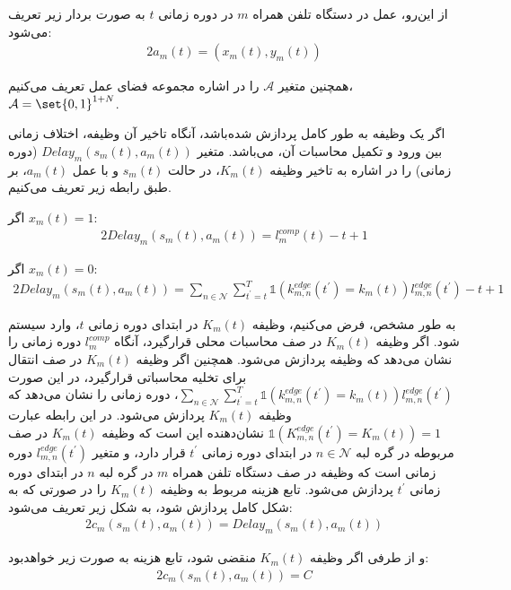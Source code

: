 

از این‌رو، عمل در دستگاه تلفن همراه $m$ در دوره زمانی $t$ به صورت بردار زیر تعریف می‌شود:
\begin{alignat}{2}
	a_m(t) = (x_m(t), y_m(t))
	\label{14}  
\end{alignat}


همچنین متغیر $\mathcal{A}$ را در اشاره مجموعه فضای عمل تعریف می‌کنیم، $\mathcal{A} = \set{0,1}^{1+N}$. 


اگر یک وظیفه به طور کامل پردازش شده‌باشد، آنگاه تاخیر آن وظیفه، اختلاف زمانی بین ورود و تکمیل محاسبات آن، می‌باشد. متغیر $Delay_m(s_m(t),a_m(t))$ (دوره زمانی) را در اشاره به تاخیر وظیفه $K_m(t)$، در حالت $s_m(t)$ و با عمل $a_m(t)$، بر طبق رابطه زیر تعریف می‌کنیم. 

اگر $x_m(t) = 1$:
\begin{alignat}{2}
	Delay_m(s_m(t),a_m(t)) = l_m^{comp}(t) - t + 1
	\label{15}  
\end{alignat}

اگر $x_m(t) = 0$:
\begin{alignat}{2}
	Delay_m(s_m(t),a_m(t)) = \sum\limits_{n \in \mathcal{N}} \sum\limits_{t^{'}=t}^{T}\mathds{1}(k_{m,n}^{edge}(t^{'}) = k_m(t))l_{m,n}^{edge}(t^{'}) - t +1
	\label{16}  
\end{alignat}


به طور مشخص، فرض می‌کنیم، وظیفه $K_m(t)$ در ابتدای دوره زمانی $t$، وارد سیستم شود. اگر وظیفه $K_m(t)$ در صف محاسبات محلی قرارگیرد، آنگاه $l_m^{comp}$ دوره زمانی را نشان می‌دهد که وظیفه پردازش می‌شود. همچنین اگر وظیفه $K_m(t)$ در صف انتقال برای تخلیه محاسباتی قرارگیرد، در این صورت $\sum\limits_{n \in \mathcal{N}} \sum\limits_{t^{'}=t}^{T}\mathds{1}(k_{m,n}^{edge}(t^{'}) = k_m(t))l_{m,n}^{edge}(t^{'})$، دوره زمانی را نشان می‌دهد که وظیفه $K_m(t)$ پردازش می‌شود. در این رابطه عبارت $\mathds{1}(K_{m,n}^{edge}(t^{'}) = K_m(t)) = 1$ نشان‌دهنده این است که وظیفه $K_m(t)$ در صف مربوطه در گره لبه $n \in \mathcal{N}$ در ابتدای دوره زمانی $t^{'}$ قرار دارد، و متغیر $l_{m,n}^{edge}(t^{'})$ دوره زمانی است که وظیفه در صف دستگاه تلفن همراه $m$ در گره لبه $n$ در ابتدای دوره زمانی $t^{'}$ پردازش می‌شود. 
تابع هزینه مربوط به وظیفه $K_m(t)$ را در صورتی که به شکل کامل پردازش شود، به شکل زیر تعریف می‌شود:
\begin{alignat}{2}
	c_m(s_m(t),a_m(t)) = Delay_m(s_m(t),a_m(t))
	\label{17}  
\end{alignat}


و از طرفی اگر وظیفه $K_m(t)$ منقضی شود، تابع هزینه به صورت زیر خواهدبود:
\begin{alignat}{2}
	c_m(s_m(t),a_m(t)) = C
	\label{18}  
\end{alignat}

